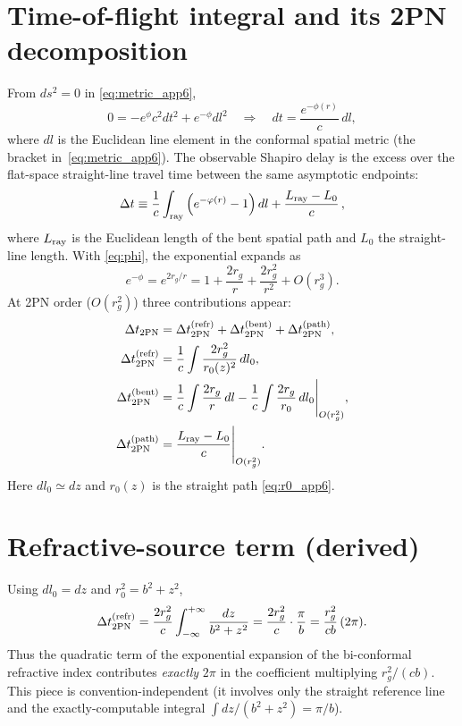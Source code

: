 \documentclass[11pt]{article}
\begin{document}
\section{Time-of-flight integral and its 2PN decomposition}
From $ds^2=0$ in \eqref{eq:metric_app6},
\begin{equation}
0=-e^{\phi}c^2dt^2+e^{-\phi}dl^2
\quad\Rightarrow\quad
dt=\frac{e^{-\phi(r)}}{c}\,dl,
\label{eq:dt_app6}
\end{equation}
where $dl$ is the Euclidean line element in the conformal
spatial metric (the bracket in~\eqref{eq:metric_app6}).
The observable Shapiro delay is the excess over the
flat-space straight-line travel time between the same
asymptotic endpoints:
\begin{equation}
\Delta t \equiv \frac{1}{c}\int_{\rm ray}\left(e^{-\phi(r)}-1\right)dl
  + \frac{L_{\rm ray}-L_0}{c}\,,
\label{eq:dtdef}
\end{equation}
where $L_{\rm ray}$ is the Euclidean length of the bent
spatial path and $L_0$ the straight-line length.
With \eqref{eq:phi}, the exponential expands as
\begin{equation}
e^{-\phi}=e^{2r_g/r}=1+\frac{2r_g}{r}+\frac{2r_g^2}{r^2}+O(r_g^3).
\label{eq:exp}
\end{equation}
At 2PN order ($O(r_g^2)$) three contributions appear:
\begin{align}
\Delta t_{2{\rm PN}} &= \Delta t_{2{\rm PN}}^{\rm (refr)}+\Delta t_{2{\rm PN}}^{\rm (bent)}+\Delta t_{2{\rm PN}}^{\rm (path)}, \label{eq:split_app6}\\
\Delta t_{2{\rm PN}}^{\rm (refr)}&=\frac{1}{c}\int \frac{2r_g^2}{r_0(z)^2}\,dl_0, \label{eq:refr2pn}\\
\Delta t_{2{\rm PN}}^{\rm (bent)}&=\frac{1}{c}\int \frac{2r_g}{r}\,dl-\frac{1}{c}\int \frac{2r_g}{r_0}\,dl_0\Bigg|_{O(r_g^2)},
\label{eq:bent2pn}\\
\Delta t_{2{\rm PN}}^{\rm (path)}&=\frac{L_{\rm ray}-L_0}{c}\Bigg|_{O(r_g^2)}.
\label{eq:path2pn}
\end{align}
Here $dl_0\simeq dz$ and $r_0(z)$ is the straight path \eqref{eq:r0_app6}.

\section{Refractive-source term (derived)}
Using $dl_0=dz$ and $r_0^2=b^2+z^2$,
\begin{equation}
\Delta t_{2{\rm PN}}^{\rm (refr)}
=\frac{2r_g^2}{c}\int_{-\infty}^{+\infty}\frac{dz}{b^2+z^2}
=\frac{2r_g^2}{c}\cdot \frac{\pi}{b}
=\frac{r_g^2}{cb}\,(2\pi).
\label{eq:refr2pi}
\end{equation}
Thus the quadratic term of the exponential expansion of the
bi-conformal refractive index contributes \emph{exactly}
$2\pi$ in the coefficient multiplying $r_g^2/(cb)$.  This
piece is convention-independent (it involves only the straight
reference line and the exactly-computable integral
$\int dz/(b^2+z^2)=\pi/b$).
\end{document}
